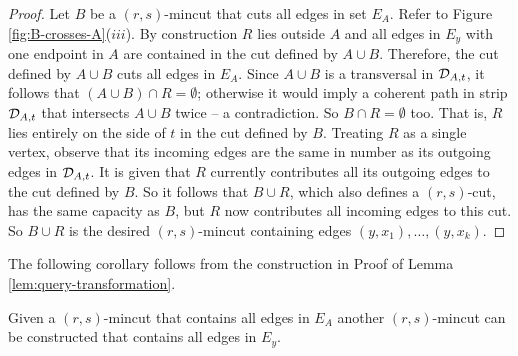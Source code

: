 \begin{proof}
Let $B$ be a $(r,s)$-mincut that cuts all edges in set $E_A$.
Refer to Figure \ref{fig:B-crosses-A}($iii$). By construction $R$ lies outside $A$ 
and all edges in $E_y$ with one endpoint in $A$ are contained in the cut defined by $A\cup B$.
 Therefore, the cut defined by $A\cup B$ cuts all edges in $E_A$.
Since $A\cup B$ is a transversal in ${\cal D}_{A,t}$, it follows that $(A\cup B) \cap R = \emptyset$; otherwise it would imply a coherent path in strip ${\cal D}_{A,t}$ that intersects $A\cup B$ twice -- a contradiction. So $B \cap R = \emptyset$ too. That is, $R$ lies entirely on the side of $t$ in the cut defined by $B$. Treating $R$ as a single vertex, observe that its incoming edges are the same in number as its outgoing edges in ${\cal D}_{A,t}$. It is given that $R$ currently contributes all its outgoing edges to the cut defined by $B$. So it follows that $B\cup R$, which also defines a $(r,s)$-cut, has the same capacity as $B$, but $R$ now contributes all incoming edges to this cut. 
 So $B\cup R$ is the desired $(r,s)$-mincut containing edges $(y,x_1),\ldots,(y,x_k)$.
\end{proof}


The following corollary follows from the construction in Proof of Lemma \ref{lem:query-transformation}.

\begin{corollary}
\label{cor:query-transformation}
Given a $(r,s)$-mincut that contains all edges in $E_A$ another $(r,s)$-mincut can be constructed that contains all edges in $E_y$.
\end{corollary}

